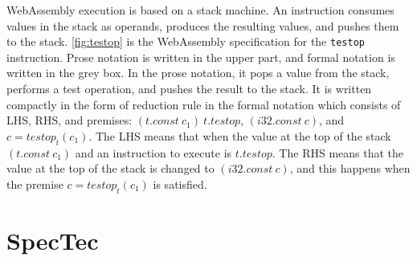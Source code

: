 WebAssembly execution is based on a stack machine.
An instruction consumes values in the stack as operands, produces the
resulting values, and pushes them to the stack.
\cref{fig:testop} is the WebAssembly specification for the \texttt{testop}
instruction.
Prose notation is written in the upper part, and formal notation is written in
the grey box.
In the prose notation, it pops a value from the stack, performs a test
operation, and pushes the result to the stack.
It is written compactly in the form of reduction rule in the formal notation
which consists of LHS, RHS, and premises: $(t.const ~ c_1) ~ t.testop$,
$(i32.const ~ c)$, and $c = testop_t(c_1)$.
The LHS means that when the value at the top of the stack $(t.const ~ c_1)$
and an instruction to execute is $t.testop$.
The RHS means that the value at the top of the stack is changed to $(i32.const
~ c)$, and this happens when the premise $c = testop_t(c_1)$ is satisfied.


\section{SpecTec}
